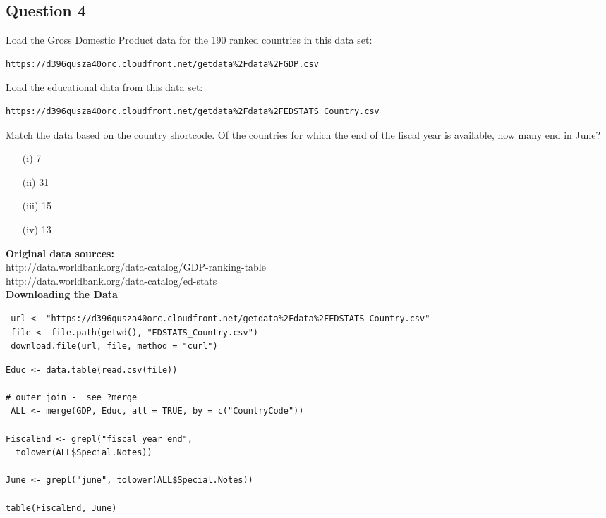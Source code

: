 \documentclass[]{article}
\begin{document}
\subsection*{Question 4}
Load the Gross Domestic Product data for the 190 ranked countries in this data set: 

\begin{verbatim}
https://d396qusza40orc.cloudfront.net/getdata%2Fdata%2FGDP.csv 
\end{verbatim}
Load the educational data from this data set: 

\begin{verbatim}
https://d396qusza40orc.cloudfront.net/getdata%2Fdata%2FEDSTATS_Country.csv 
\end{verbatim}
Match the data based on the country shortcode. Of the countries for which the end of the fiscal year is available, how many end in June? 

\begin{itemize}
\item[(i)] 7
\item[(ii)] 31
\item[(iii)] 15
\item[(iv)] 13
\end{itemize}

\noindent \textbf{Original data sources: }\\
http://data.worldbank.org/data-catalog/GDP-ranking-table \\
http://data.worldbank.org/data-catalog/ed-stats \\

\noindent \textbf{
Downloading the Data}

\begin{verbatim}
 url <- "https://d396qusza40orc.cloudfront.net/getdata%2Fdata%2FEDSTATS_Country.csv"
 file <- file.path(getwd(), "EDSTATS_Country.csv")
 download.file(url, file, method = "curl")
\end{verbatim}

\begin{framed}
\begin{verbatim}
Educ <- data.table(read.csv(file))

# outer join -  see ?merge
 ALL <- merge(GDP, Educ, all = TRUE, by = c("CountryCode"))

FiscalEnd <- grepl("fiscal year end", 
  tolower(ALL$Special.Notes))
  
June <- grepl("june", tolower(ALL$Special.Notes))

table(FiscalEnd, June)
\end{verbatim}
\end{framed}
\newpage
\end{document}
